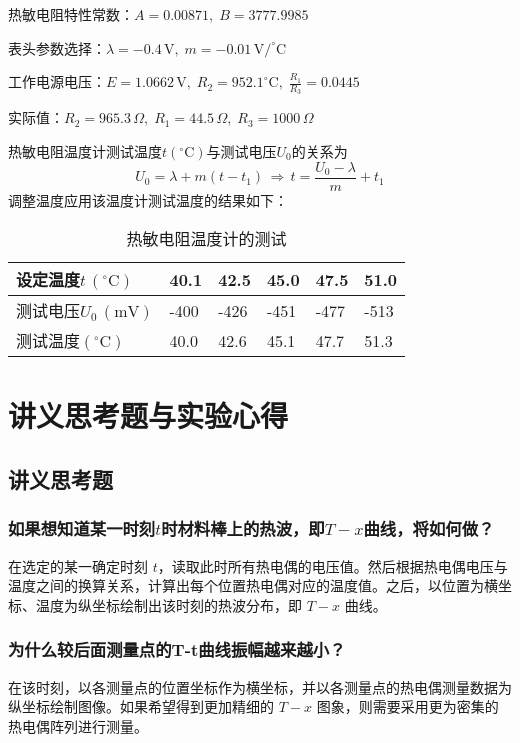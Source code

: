 \documentclass[UTF-8,twoside,cs4size]{ctexart}
\begin{document}
	热敏电阻特性常数：$ A=0.00871,\;B=3777.9985 $
	
	表头参数选择：$ \lambda=-0.4\,\mathrm V,\;m=-0.01\,\mathrm{V/^\circ \mathrm{C}} $
	
	工作电源电压：$ E=1.0662\,\mathrm V,\;R_2=952.1^\circ \mathrm{C},\;\frac{R_1}{R_3}=0.0445 $
	
	实际值：$ R_2=965.3\,\Omega,\;R_1=44.5\,\Omega,\;R_3=1000\,\Omega $
	
	热敏电阻温度计测试温度$ t(^\circ \mathrm{C}) $与测试电压$ U_0 $的关系为
	\[U_0=\lambda+m(t-t_1)\,\Longrightarrow\,t=\frac{U_0-\lambda}{m}+t_1\]
	调整温度应用该温度计测试温度的结果如下：
	\begin{table}[!h]
		\centering
		\renewcommand\arraystretch{1.8}
		\caption{热敏电阻温度计的测试}
		\begin{tabular}{|l|l|l|l|l|l|}
			\hline
			设定温度$ t\,(^\circ \mathrm{C}) $ & 40.1 & 42.5 & 45.0 & 47.5 & 51.0 \\ \hline
			测试电压$ U_0\,(\mathrm{mV}) $ &-400 &-426 & -451 & -477 &-513 \\ \hline
			测试温度$ (^\circ \mathrm{C}) $ & 40.0 & 42.6 & 45.1 & 47.7 & 51.3 \\ \hline
		\end{tabular}
	\end{table}

\section{讲义思考题与实验心得}
\subsection{讲义思考题}
\subsubsection{如果想知道某一时刻$ t $时材料棒上的热波，即$ T-x $曲线，将如何做？}
在选定的某一确定时刻 $t$，读取此时所有热电偶的电压值。然后根据热电偶电压与温度之间的换算关系，计算出每个位置热电偶对应的温度值。之后，以位置为横坐标、温度为纵坐标绘制出该时刻的热波分布，即 $T-x$ 曲线。

\subsubsection{为什么较后面测量点的T-t曲线振幅越来越小？}
在该时刻，以各测量点的位置坐标作为横坐标，并以各测量点的热电偶测量数据为纵坐标绘制图像。如果希望得到更加精细的 $T-x$ 图象，则需要采用更为密集的热电偶阵列进行测量。
\end{document}
